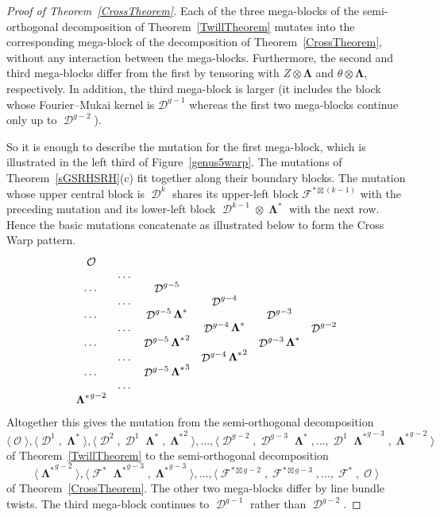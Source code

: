 \documentclass[11pt,letterpaper]{amsart}
\theoremstyle{plain}
\theoremstyle{definition}
\theoremstyle{remark}
\numberwithin{equation}{section}
\DeclareMathOperator{\cD}{\mathcal{D}}
\DeclareMathOperator{\cF}{\mathcal{F}}
\DeclareMathOperator{\cO}{\mathcal{O}}
\DeclareMathOperator{\bLambda}{{\boldsymbol\Lambda}}
\begin{document}
\begin{proof}[Proof of Theorem~\ref{CrossTheorem}]
Each of the three mega-blocks of the semi-orthogonal decomposition of Theorem~\ref{TwillTheorem} mutates
into the corresponding mega-block of the decomposition of Theorem~\ref{CrossTheorem},
without any interaction between the mega-blocks. 
Furthermore, the second and third mega-blocks differ from the first by
tensoring with $Z\otimes\boldsymbol\Lambda$ and
$\theta\otimes\boldsymbol\Lambda$, respectively.
In addition, the third mega-block is larger (it includes the block whose
Fourier--Mukai kernel is $\mathcal D^{g-1}$ whereas the first two mega-blocks continue only up to $\cD^{g-2}$).



So it is enough to describe the mutation for the first mega-block, which is illustrated in %
the left third of Figure~\ref{genus5warp}.
The  mutations of Theorem~\ref{sGSRHSRH}(c) fit together along their
boundary blocks.  
The mutation whose upper central block is $\cD^k$ shares
its upper-left block ${\mathcal F^{*\boxtimes (k-1)}}$ with the preceding mutation and its
lower-left block $\cD^{k-1}\otimes\bLambda^*$ with the next row.  Hence the
basic mutations concatenate as illustrated below to form the Cross Warp pattern.
$$
\begin{matrix}
\cO\cr
&\ldots&\cr
\ldots&&\cD^{g-5}&&&\cr
&\ldots&&\cD^{g-4}&&\cr
\ldots&&\cD^{g-5}\bLambda^*&&\cD^{g-3}&\cr
&\ldots&&\cD^{g-4}\bLambda^*&&\cD^{g-2}\cr
\ldots&&\cD^{g-5}{\bLambda^*}^2&&\cD^{g-3}\bLambda^*&\cr
&\ldots&&\cD^{g-4}{\bLambda^*}^2&&\cr
\ldots&&\cD^{g-5}{\bLambda^*}^3&&&\cr
&\ldots&\cr
{\bLambda^*}^{g-2}\cr
\end{matrix}
$$
Altogether this gives the mutation from the semi-orthogonal decomposition
$$\langle\cO\rangle,\langle\cD^1,\bLambda^*\rangle,\langle \cD^2,\cD^1\bLambda^*,{\bLambda^*}^2\rangle,\ldots,\langle\cD^{g-2},\cD^{g-3}{\bLambda^*},\ldots,\cD^1{\bLambda^*}^{g-3},{\bLambda^*}^{g-2}\rangle$$ of Theorem~\ref{TwillTheorem} to
 the semi-orthogonal decomposition
$$\langle{\bLambda^*}^{g-2}\rangle,\langle\cF^*{\bLambda^*}^{g-3},{\bLambda^*}^{g-3}\rangle,
\ldots,
\langle {\cF^{*\boxtimes g-2}}, {\cF^{*\boxtimes g-3}},\ldots,\cF^*,\cO\rangle$$ 
of Theorem~\ref{CrossTheorem}. The other two mega-blocks differ by  line bundle twists.
The third mega-block continues to $\cD^{g-1}$ rather than $\cD^{g-2}$.
\end{proof}
\end{document}
